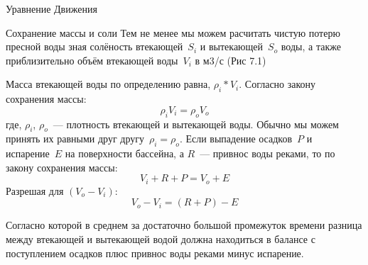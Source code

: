 \begin{chapter}{Уравнение Движения}
\begin{section}{Сохранение массы и соли}
Тем не менее мы можем расчитать чистую потерю пресной воды зная
солёность втекающей~$S_i$ и вытекающей~$S_o$ воды, а также приблизительно
объём втекающей воды~$V_i$ в м3/с (Рис 7.1)
%
%

Масса втекающей воды по определению равна, $\rho_i*V_i$. Согласно закону
сохранения массы:
\begin{equation}
\rho_i V_i = \rho_o V_o
\end{equation}
где, $\rho_i$, $\rho_o$~--- плотность втекающей и вытекающей
воды. Обычно мы можем принять их равными друг другу~$\rho_i = \rho_o$.  Если
выпадение осадков~$P$ и испарение~$E$ на поверхности бассейна, а $R$~---
привнос воды реками, то по закону сохранения массы:
\begin{equation}
V_i + R + P = V_o + E
\end{equation}
Разрешая для $(V_o - V_i)$:
\begin{equation}
V_o - V_i = (R + P) - E
\end{equation}

Согласно которой в среднем за достаточно большой промежуток времени
разница между втекающей и вытекающей водой должна находиться в балансе
с поступлением осадков плюс привнос воды реками минус испарение.
%
%


\end{section}
\end{chapter}
